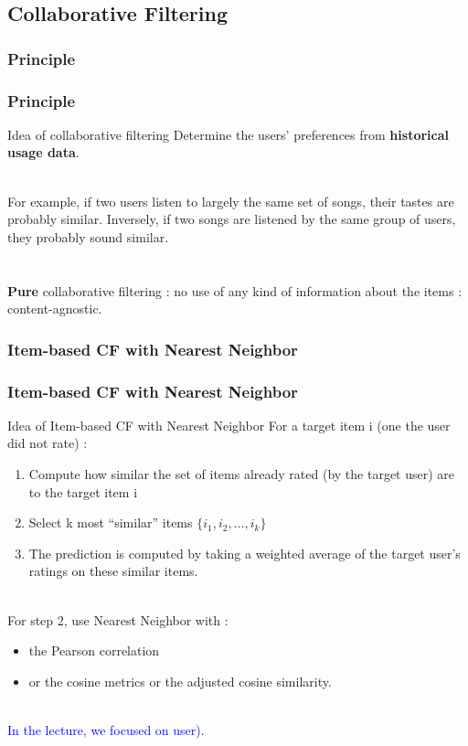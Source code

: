 \documentclass[10pt,handout,english]{beamer}
\begin{document}
		\subsection{Collaborative Filtering}
			\subsubsection{Principle}
			\begin{frame}
			\frametitle{Principle}
				\begin{block}{Idea of collaborative filtering}
					Determine the users' preferences from \textbf{historical usage data}.
				\end{block}~\\
				For example, if two users listen to largely the same set of songs, their tastes are probably similar. Inversely, if two songs are listened by the same group of users, they probably sound similar.\\~\\~\\

				\textbf{Pure} collaborative filtering : no use of any kind of information about the items : content-agnostic.

			\end{frame}

			\subsubsection{Item-based CF with Nearest Neighbor}
			\begin{frame}
			\frametitle{Item-based CF with Nearest Neighbor}
				\begin{block}{Idea of Item-based CF with Nearest Neighbor}
					For a target item i (one the user did not rate) :
					\begin{enumerate}
						\item Compute how similar the set of items already rated (by the target user) are to the target item i
						\item Select k most ``similar'' items $\{i_1, i_2, \ldots, i_k\}$
						\item The prediction is computed by taking a weighted average of the target user's ratings on these similar items.
					\end{enumerate}
				\end{block}~\\

				For step 2, use Nearest Neighbor with :
				\begin{itemize}
					\item the Pearson correlation
					\item or the cosine metrics or the adjusted cosine similarity.\\~\\
				\end{itemize}
				\textcolor{blue}{In the lecture, we focused on user).}


			\end{frame}
\end{document}
